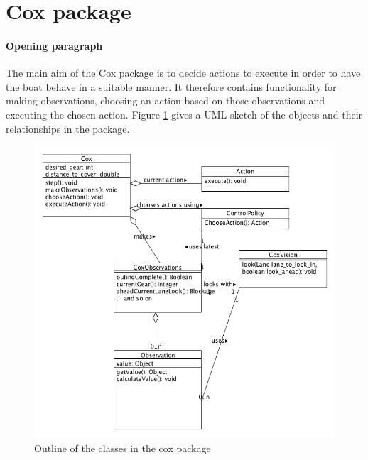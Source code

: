 

\section{Cox package}
\paragraph{Opening paragraph}
The main aim of the Cox package is to decide actions to execute in order to have the boat behave in a suitable manner. It therefore contains functionality for making observations, choosing an action based on those observations and executing the chosen action. Figure \ref{software:fig:coxUML} gives a UML sketch of the objects and their relationships in the package.

\begin{figure}
\begin{center}
  \includegraphics[scale=0.3]{images/coxpackageUML.png}
  \caption{Outline of the classes in the cox package}
  \label{software:fig:coxUML}
\end{center}
\end{figure}

